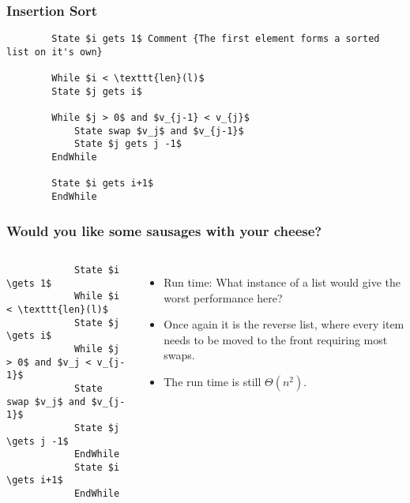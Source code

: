 \begin{frame}[fragile]
	\frametitle{Insertion Sort}
	
	\begin{lstlisting}
		State $i gets 1$ Comment {The first element forms a sorted list on it's own}
		
		While $i < \texttt{len}(l)$
		State $j gets i$
		
		While $j > 0$ and $v_{j-1} < v_{j}$ 
			State swap $v_j$ and $v_{j-1}$	
			State $j gets j -1$
		EndWhile
		
		State $i gets i+1$
		EndWhile
	\end{lstlisting}
	
	\begin{center}
	
	\end{center}
\end{frame}

\begin{frame}[fragile]
	\frametitle{Would you like some sausages with your cheese?}
	
	\begin{columns}[T]
		\begin{lstlisting}
			State $i \gets 1$ 
			While $i < \texttt{len}(l)$
			State $j \gets i$
			While $j > 0$ and $v_j < v_{j-1}$
			State swap $v_j$ and $v_{j-1}$	
			State $j \gets j -1$
			EndWhile
			State $i \gets i+1$
			EndWhile
		\end{lstlisting}
			\begin{itemize}
				\item Run time:		What instance of a list would give the worst performance here?	
				\item Once again it is the reverse list, where every item needs to be moved to the front requiring most swaps.
				\item The run time is still $\Theta(n^2)$.
			\end{itemize}	
	\end{columns}
\end{frame}


